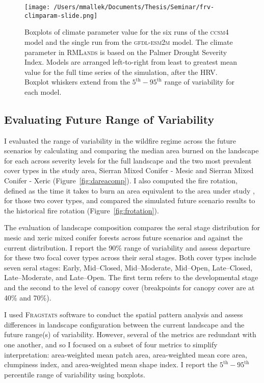 \begin{figure}[!htbp]
\centering
\texttt{[image: /Users/mmallek/Documents/Thesis/Seminar/frv-climparam-slide.png]}
\caption{Boxplots of climate parameter value for the six runs of the \textsc{ccsm4} model and the single run from the \textsc{gfdl-esm2m} model. The climate parameter in \textsc{RMLands} is based on the Palmer Drought Severity Index. Models are arranged left-to-right from least to greatest mean value for the full time series of the simulation, after the HRV. Boxplot whiskers extend from the $5^{\text{th}}-95^{\text{th}}$ range of variability for each model.}
\label{pdsi-boxplots}
\end{figure}


\subsection*{Evaluating Future Range of Variability}
I evaluated the range of variability in the wildfire regime across the future scenarios by calculating and comparing the median area burned on the landscape for each across severity levels for the full landscape and the two most prevalent cover types in the study area, Sierran Mixed Conifer - Mesic and Sierran Mixed Conifer - Xeric (Figure~\ref{fig:dareacomp}). %
I also computed the fire rotation, defined as the time it takes to burn an area equivalent to the area under study \citep{Agee1993}, for those two cover types, and compared the simulated future scenario results to the historical fire rotation (Figure~\ref{fig:frotation}). 
%


The evaluation of landscape composition compares the seral stage distribution for mesic and xeric mixed conifer forests across future scenarios and against the current distribution. I report the 90\% range of variability and assess departure for these two focal cover types across their seral stages. Both cover types include seven seral stages: Early, Mid--Closed, Mid--Moderate, Mid--Open, Late--Closed, Late--Moderate, and Late--Open. The first term refers to the developmental stage and the second to the level of canopy cover (breakpoints for canopy cover are at 40\% and 70\%).


%
I used \textsc{Fragstats} software \citep{Fragstats2012} to conduct the spatial pattern analysis and assess differences in landscape configuration between the current landscape and the future range(s) of variability. However, several of the metrics are redundant with one another, and so I focused on a subset of four metrics to simplify interpretation: area-weighted mean patch area, area-weighted mean core area, clumpiness index, and area-weighted mean shape index. I report the $5^{\text{th}}-95^{\text{th}}$ percentile range of variability using boxplots. %

